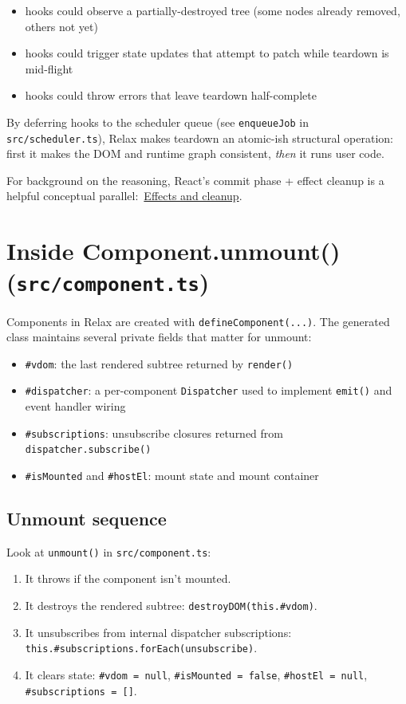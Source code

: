 \begin{itemize}
  \item hooks could observe a partially-destroyed tree (some nodes already removed, others not yet)
  \item hooks could trigger state updates that attempt to patch while teardown is mid-flight
  \item hooks could throw errors that leave teardown half-complete
\end{itemize}

By deferring hooks to the scheduler queue (see \texttt{enqueueJob} in \texttt{src/scheduler.ts}), Relax makes teardown an atomic-ish structural operation: first it makes the DOM and runtime graph consistent, \emph{then} it runs user code.

For background on the reasoning, React's commit phase + effect cleanup is a helpful conceptual parallel:\ \href{https://react.dev/reference/react/useEffect#effects-and-cleanup}{Effects and cleanup}.

\section{Inside Component.unmount() (\texttt{src/component.ts})}

Components in Relax are created with \texttt{defineComponent(...)}. The generated class maintains several private fields that matter for unmount:

\begin{itemize}
  \item \texttt{\#vdom}: the last rendered subtree returned by \texttt{render()}
  \item \texttt{\#dispatcher}: a per-component \texttt{Dispatcher} used to implement \texttt{emit()} and event handler wiring
  \item \texttt{\#subscriptions}: unsubscribe closures returned from \texttt{dispatcher.subscribe()}
  \item \texttt{\#isMounted} and \texttt{\#hostEl}: mount state and mount container
\end{itemize}

\subsection{Unmount sequence}

Look at \texttt{unmount()} in \texttt{src/component.ts}:

\begin{enumerate}
  \item It throws if the component isn't mounted.
  \item It destroys the rendered subtree: \texttt{destroyDOM(this.\#vdom)}.
  \item It unsubscribes from internal dispatcher subscriptions: \texttt{this.\#subscriptions.forEach(unsubscribe)}.
  \item It clears state: \texttt{\#vdom = null}, \texttt{\#isMounted = false}, \texttt{\#hostEl = null}, \texttt{\#subscriptions = []}.
\end{enumerate}

